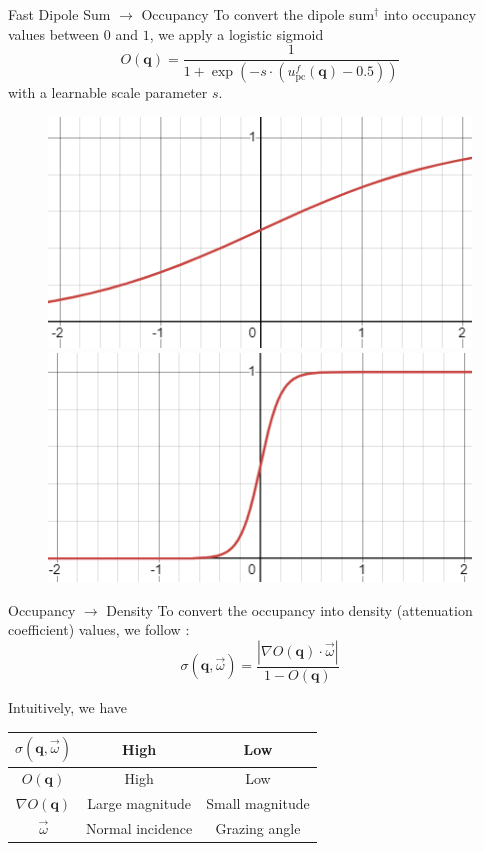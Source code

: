\documentclass[10pt]{beamer}
\newcommand{\bq}{\mathbf{q}}
\begin{document}
 {
  \begin{frame}{Fast Dipole Sum \(\rightarrow\) Occupancy}
      To convert the dipole sum\(^\dagger\) into \alert{occupancy} values between \(0\) and \(1\), we apply a logistic sigmoid
      \begin{equation*}
          O(\bq) = \frac{1}{1 + \exp\left(-s\cdot (u^f_\mathrm{pc}(\bq) - 0.5)\right)}
      \end{equation*}
      with a learnable scale parameter \(s\).

      \begin{figure}
          \centering
          \includegraphics[width=0.4\linewidth]{figures/wn/sigmoid_1.png}\hspace{1em}
          \includegraphics[width=0.4\linewidth]{figures/wn/sigmoid_10.png}
      \end{figure}
  \end{frame}
 }

\begin{frame}{Occupancy \(\rightarrow\) Density}
    To convert the occupancy into \alert{density} (attenuation coefficient) values, we follow \citet{Miller:VOS:2023}:
    \begin{equation*}
        \sigma(\bq, \vec{\omega}) = \frac{|\nabla O(\bq) \cdot \vec{\omega}|}{1 - O(\bq)}
    \end{equation*}

    Intuitively, we have
    \begin{center}
        \begin{tabular}{c|c|c}
            \(\sigma(\bq, \vec{\omega})\) & High             & Low             \\
            \hline
            \(O(\bq)\)                    & High             & Low             \\
            \(\nabla O(\bq)\)             & Large magnitude  & Small magnitude \\
            \(\vec{\omega}\)              & Normal incidence & Grazing angle
        \end{tabular}
    \end{center}
\end{frame}
\end{document}
